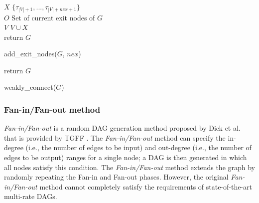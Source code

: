 \begin{algorithm}[t]
    {\footnotesize
    $X$ \la $\{\tau_{|V|+1}, ..., \tau_{|V|+nex+1}\}$ \\
    $O$ \la Set of current exit nodes of $G$ \\
    $V$ \la $V \cup X$ \\
    return $G$
    \caption{add\_exit\_nodes($G$, $nex$)}
    \label{alg: add_exit_nodes}
    }
\end{algorithm}


\begin{algorithm}[t]
    {\footnotesize
        return $G$
        \caption{weakly\_connect($G$)}
        \label{alg: weakly_connect}
    }
\end{algorithm}


\subsubsection{Fan-in/Fan-out method}
\label{sssec: fan_in_fan_out}

{\it Fan-in/Fan-out} is a random DAG generation method proposed by Dick et al. that is provided by TGFF \cite{tgff}.
The {\it Fan-in/Fan-out} method can specify the in-degree (i.e., the number of edges to be input) and out-degree (i.e., the number of edges to be output) ranges for a single node; a DAG is then generated in which all nodes satisfy this condition.
The {\it Fan-in/Fan-out} method extends the graph by randomly repeating the Fan-in and Fan-out phases.
However, the original {\it Fan-in/Fan-out} method cannot completely satisfy the requirements of state-of-the-art multi-rate DAGs.

